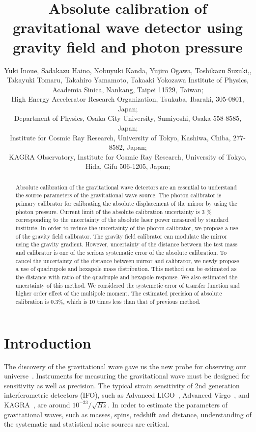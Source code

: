 \documentclass[A4]{spie}  %
\title{Absolute calibration of gravitational wave detector using gravity field and photon pressure}
\author{Yuki Inoue\supit{a,b}, Sadakazu Haino\supit{a}, Nobuyuki Kanda\supit{c}, Yujiro Ogawa\supit{b}, Toshikazu Suzuki,\supit{d}, Takayuki Tomaru\supit{b}, Takahiro Yamamoto\supit{e}, Takaaki Yokozawa\supit{e}
\skiplinehalf
\supit{a}Institute of Physics, Academia Sinica, Nankang, Taipei 11529, Taiwan; \\
\supit{b}High Energy Accelerator Research Organization, Tsukuba, Ibaraki, 305-0801, Japan;\\
\supit{c}Department of Physics, Osaka City University, Sumiyoshi, Osaka 558-8585, Japan;\\
\supit{d}Institute for Cosmic Ray Research, University of Tokyo, Kashiwa, Chiba, 277-8582, Japan;\\
\supit{e}KAGRA Observatory, Institute for Cosmic Ray Research, University of Tokyo, Hida, Gifu 506-1205, Japan;\\
}
\begin{document}
 
  \maketitle 

\begin{abstract}
Absolute calibration of the gravitational wave detectors are an essential to understand the source parameters of the gravitational wave source. The photon calibrator is primary calibrator for calibrating the absolute displacement of the mirror by using the photon pressure. Current limit of the absolute calibration uncertainty is 3 \% corresponding to the uncertainty of the absolute laser power measured by standard institute.  In order to reduce the uncertainty of the photon calibrator, we propose a use of the gravity field calibrator. The gravity field calibrator can modulate the mirror using the gravity gradient. However, uncertainty of the distance between the test mass and calibrator is one of the serious systematic error of the absolute calibration. To cancel the uncertainty of the distance between mirror and calibrator, we newly propose a use of quadrupole and hexapole mass distribution. This method can be estimated as the distance with ratio of the quadruple and hexapole response. We also estimated the uncertainty of this method. We considered the systemetic error of transfer function and higher order effect of the multipole moment. The estimated precision of absolute calibration is 0.3\%, which is 10 times less than that of previous method.

\end{abstract}



\section{Introduction}

The discovery of the gravitational wave gave us the new probe for observing our universe~\cite{PhysRevLett.116.061102}. 
Instruments for measuring the gravitational wave must be designed for sensitivity as well as precision.
The typical strain sensitivity of 2nd generation interferometric detectors (IFO), such as Advanced LIGO~\cite{}, Advanced Virgo~\cite{0264-9381-32-2-024001}, and KAGRA~\cite{0264-9381-29-12-124007, PhysRevD.88.043007}, are around $10^{-23}/\sqrt{Hz}$. In order to estimate the parameters of gravitational waves, such as masses, spins, redshift and distance, understanding of the systematic and statistical noise sources are critical.
\end{document}
